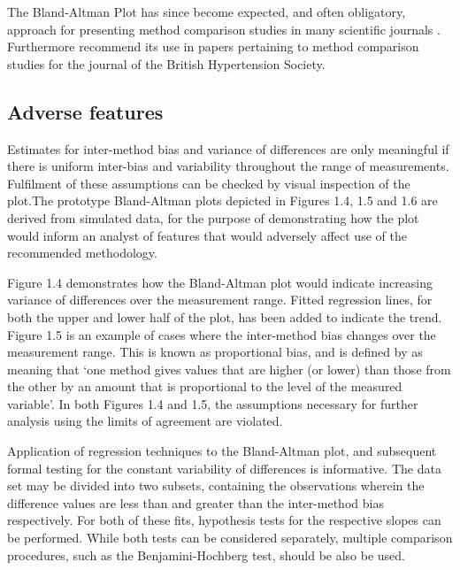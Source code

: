 \documentclass[Chap2main.tex]{subfiles}
\begin{document}
The Bland-Altman Plot has since become expected, and
often obligatory, approach for presenting method comparison
studies in many scientific journals \citep{hollis}. Furthermore
\citet{BritHypSoc} recommend its use in papers pertaining to
method comparison studies for the journal of the British
Hypertension Society.

\subsection{Adverse features}

Estimates for inter-method bias and variance of differences are only meaningful if there is uniform inter-bias and variability throughout the range of measurements. Fulfilment of these assumptions can be checked by visual inspection of the plot.The prototype Bland-Altman plots depicted in Figures 1.4, 1.5 and 1.6 are derived from simulated data, for the purpose of demonstrating how the plot would inform an analyst of features that would adversely affect use of the recommended methodology.

Figure 1.4 demonstrates how the Bland-Altman plot would indicate
increasing variance of differences over the measurement range.
Fitted regression lines, for both the upper and lower half of the
plot, has been added to indicate the trend. Figure 1.5 is an
example of cases where the inter-method bias changes over the
measurement range. This is known as proportional bias, and is
defined by \citet{ludbrook97} as meaning that `one method gives
values that are higher (or lower) than those from the other by an
amount that is proportional to the level of the measured
variable'. In both Figures 1.4 and 1.5, the assumptions necessary
for further analysis using the limits of agreement are violated.

Application of regression techniques to the Bland-Altman plot, and
subsequent formal testing for the constant variability of
differences is informative. The data set may be divided into two
subsets, containing the observations wherein the difference values
are less than and greater than the inter-method bias respectively.
For both of these fits, hypothesis tests for the respective slopes
can be performed. While both tests can be considered separately,
multiple comparison procedures, such as the Benjamini-Hochberg
\citep{BH} test, should be also be used.
\end{document}
